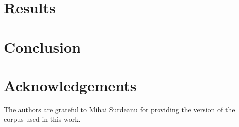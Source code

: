 \documentclass[11pt]{article}
\begin{document}
\section{Results}\label{sec:results}



\section{Conclusion} \label{sec:conclusion}



\section*{Acknowledgements}

The authors are grateful to Mihai Surdeanu for providing the version of
the corpus used in this work.



\end{document}
